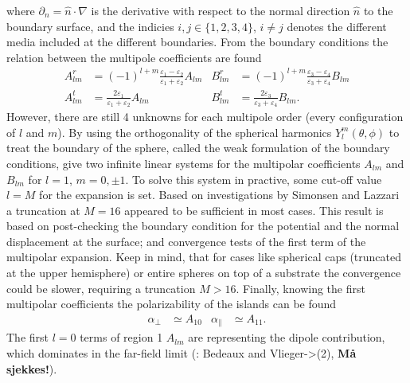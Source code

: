 where $\partial_n = \hat{n} \cdot \nabla$ is the derivative with respect to the 
normal direction $\hat{n}$ to the boundary surface, and the indicies $i,j \in \{1,2,3,4\}$, $i \neq j$
denotes the different media included at the different boundaries.
%
From the boundary conditions the relation between the multipole coefficients are found
%
\begin{subequations}
\label{multExpCoeff1}
\begin{align}
   A^r_{lm} & = (-1)^{l+m} \frac{\varepsilon_1 - \varepsilon_2}{\varepsilon_1 + \varepsilon_2} A_{lm}
   \label{multExpCoeffAr}\\
%
   A^t_{lm} & = \frac{2\varepsilon_1}{\varepsilon_1 + \varepsilon_2} A_{lm}
   \label{multExpCoeffAt}
\end{align}
\label{multExpCoeff2}
\begin{align}
   B^r_{lm} & = (-1)^{l+m} \frac{\varepsilon_3 - \varepsilon_4}{\varepsilon_3 + \varepsilon_4} B_{lm}
   \label{multExpCoeffBr}\\
%
   B^t_{lm} & = \frac{2\varepsilon_3}{\varepsilon_3 + \varepsilon_4} B_{lm}.
   \label{multExpCoeffAt}
\end{align}
\end{subequations}
%
However, there are still 4 unknowns for each multipole order (every configuration of $l$ and $m$).
By using the orthogonality of the spherical harmonics $Y_l^m(\theta,\phi)$ to treat the boundary
of the sphere, called the weak formulation of the boundary conditions, give two infinite linear 
systems for the multipolar coefficients $A_{lm}$ and $B_{lm}$ for $l = 1$, $m = 0, \pm 1$.
To solve this system in practive, some cut-off value $l = M$ for the expansion is set. 
Based on investigations by Simonsen and Lazzari \cite{Simonsen2000}
a truncation at $M = 16$ appeared to be sufficient in most cases. This result is based on 
post-checking the boundary condition for the potential and the normal displacement at the surface;
and convergence tests of the first term of the multipolar expansion. Keep in mind, that for 
cases like spherical caps (truncated at the upper hemisphere) or entire spheres on top of a substrate
the convergence could be slower, requiring a truncation $M>16$.
Finally, knowing the first multipolar coefficients the polarizability of the islands can be found
\begin{align}
   \alpha_{\perp} &\simeq A_{10}          &\alpha_{\parallel} &\simeq A_{11}.
\end{align}
The first $l=0$ terms of region 1 $A_{lm}$ are representing the dipole contribution, which dominates
in the far-field limit (\cite{Lie2010}: Bedeaux and Vlieger->(2), \textbf{Må sjekkes!}). 

